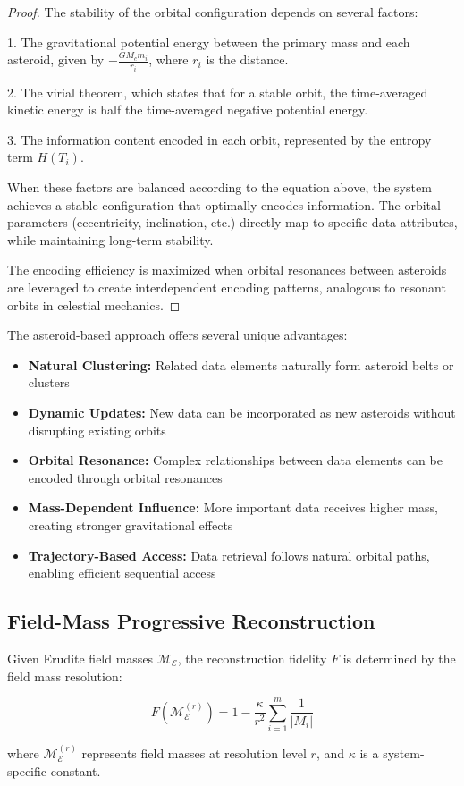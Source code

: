 \begin{proof}
The stability of the orbital configuration depends on several factors:

1. The gravitational potential energy between the primary mass and each asteroid, given by $-\frac{G M_c m_i}{r_i}$, where $r_i$ is the distance.

2. The virial theorem, which states that for a stable orbit, the time-averaged kinetic energy is half the time-averaged negative potential energy.

3. The information content encoded in each orbit, represented by the entropy term $H(T_i)$.

When these factors are balanced according to the equation above, the system achieves a stable configuration that optimally encodes information. The orbital parameters (eccentricity, inclination, etc.) directly map to specific data attributes, while maintaining long-term stability.

The encoding efficiency is maximized when orbital resonances between asteroids are leveraged to create interdependent encoding patterns, analogous to resonant orbits in celestial mechanics.
\end{proof}

The asteroid-based approach offers several unique advantages:

\begin{itemize}
    \item \textbf{Natural Clustering:} Related data elements naturally form asteroid belts or clusters
    \item \textbf{Dynamic Updates:} New data can be incorporated as new asteroids without disrupting existing orbits
    \item \textbf{Orbital Resonance:} Complex relationships between data elements can be encoded through orbital resonances
    \item \textbf{Mass-Dependent Influence:} More important data receives higher mass, creating stronger gravitational effects
    \item \textbf{Trajectory-Based Access:} Data retrieval follows natural orbital paths, enabling efficient sequential access
\end{itemize}

\subsection{Field-Mass Progressive Reconstruction}

\begin{proposition}
Given Erudite field masses $\mathcal{M}_\mathcal{E}$, the reconstruction fidelity $F$ is determined by the field mass resolution:

\begin{equation}
F(\mathcal{M}_\mathcal{E}^{(r)}) = 1 - \frac{\kappa}{r^2} \sum_{i=1}^m \frac{1}{|M_i|}
\end{equation}

where $\mathcal{M}_\mathcal{E}^{(r)}$ represents field masses at resolution level $r$, and $\kappa$ is a system-specific constant.
\end{proposition}

